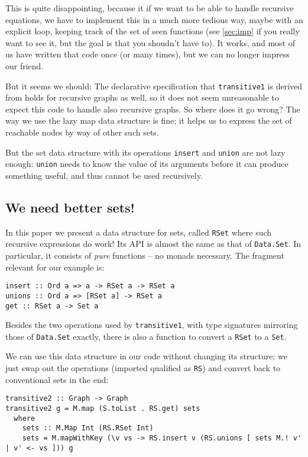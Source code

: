 \documentclass[manuscript,screen,acmsmall]{acmart}
\begin{document}
This is quite disappointing, because it if we want to be able to handle recursive equations, we have to implement this in a much more tedious way, maybe with an explicit loop, keeping track of the set of seen functions (see \cref{sec:imp} if you really want to see it, but the goal is that you shoudn’t have to). It works, and most of us have written that code once (or many times), but we can no longer impress our friend.

But it seems we should: The declarative specification that \verb|transitive1| is derived from holds for recursive graphs as well, so it does not seem unreasonable to expect this code to handle also recursive graphs. So where does it go wrong? The way we use the lazy map data structure is fine; it helps us to express the set of reachable nodes by way of other such sets.

But the set data structure with its operations \verb|insert| and \verb|union| are not lazy enough: \verb|union| needs to know the value of its arguments before it can produce something useful, and thus cannot be used recursively.

\subsection{We need better sets!}

In this paper we present a data structure for sets, called \verb|RSet| where such recursive expressions do work! Its API is almost the same as that of \verb|Data.Set|. In particular, it consists of \emph{pure} functions -- no monads necessary. The fragment relevant for our example is:
\begin{verbatim}
insert :: Ord a => a -> RSet a -> RSet a
unions :: Ord a => [RSet a] -> RSet a
get :: RSet a -> Set a
\end{verbatim}
Besides the two operations used by \verb|transitive1|, with type signatures mirroring those of \verb|Data.Set| exactly, there is also a function to convert a \verb|RSet| to a \verb|Set|.

We can use this data structure in our code without changing its structure; we just swap out the operations (imported qualified as \verb|RS|) and convert back to conventional sets in the end:
\begin{verbatim}
transitive2 :: Graph -> Graph
transitive2 g = M.map (S.toList . RS.get) sets
  where
    sets :: M.Map Int (RS.RSet Int)
    sets = M.mapWithKey (\v vs -> RS.insert v (RS.unions [ sets M.! v' | v' <- vs ])) g
\end{verbatim}
\end{document}
